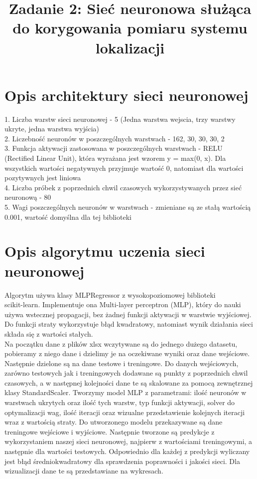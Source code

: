 \documentclass{classrep}
\author{
  \studentinfo{Maciej Pracucik}{216869}
}
\title{\textbf{Zadanie 2: Sieć neuronowa służąca do korygowania pomiaru systemu lokalizacji}}
\begin{document}
\maketitle

\section{Opis architektury sieci neuronowej}
{
	1. Liczba warstw sieci neuronowej - 5 (Jedna warstwa wejscia, trzy warstwy ukryte, jedna warstwa wyjścia) \\
	2. Liczebność neuronów w poszczególnych warstwach - 162, 30, 30, 30, 2 \\
	3. Funkcja aktywacji zastosowana w poszczególnych warstwach - RELU \\ (Rectified Linear Unit), która wyrażana jest wzorem y = max(0, x). Dla wszystkich wartości negatywnych przyjmuje wartość 0, natomiast dla wartości pozytywnych jest liniowa \\
	4. Liczba próbek z poprzednich chwil czasowych wykorzystywanych przez sieć neuronową - 80 \\
	5. Wagi poszczególnych neuronów w warstwach - zmieniane są ze stałą wartością 0.001, wartość domyślna dla tej biblioteki \\
 }

\section{Opis algorytmu uczenia sieci neuronowej}
{
	Algorytm używa klasy MLPRegressor z wysokopoziomowej biblioteki \\scikit-learn. Implementuje ona Multi-layer perceptron (MLP), który do nauki używa wstecznej propagacji, bez żadnej 
	funkcji aktywacji w warstwie wyjściowej. Do funkcji straty wykorzystuje błąd kwadratowy, natomiast wynik działania sieci składa się z wartości stałych. \\
	Na początku dane z plików xlsx wczytywane są do jednego dużego datasetu, pobieramy z niego dane i dzielimy je na oczekiwane wyniki oraz dane wejściowe.
	Następnie dzielone są na dane testowe i treningowe.
	Do danych wejściowych, zarówno testowych jak i treningowych dodawane są punkty z poprzednich chwil czasowych, a w następnej kolejności dane te są skalowane za pomocą zewnętrznej klasy StandardScaler. Tworzymy model MLP z parametrami: ilość neuronów w warstwach ukrytych oraz ilość tych warstw, typ funkcji aktywacji, solver do optymalizacji wag, ilość iteracji oraz wizualne 		przedstawienie kolejnych iteracji wraz z wartością straty. Do utworzonego modelu przekazywane są dane treningowe wejściowe i wyjściowe. Następnie tworzone są predykcje z wykorzystaniem naszej sieci neuronowej, najpierw z wartościami treningowymi, a następnie dla wartości testowych. Odpowiednio dla  każdej z predykcji wyliczany jest błąd średniokwadratowy dla sprawdzenia 			poprawności i jakości sieci. Dla wizualizacji dane te są przedstawiane na wykresach.
}
\end{document}
